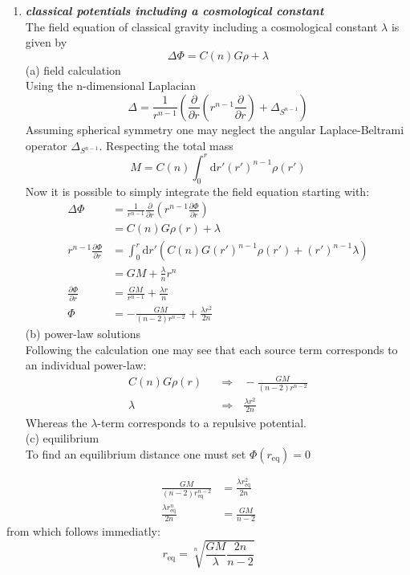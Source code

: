 \documentclass[a4paper,12pt]{article}
\newcommand{\question}[1]{\textbf{\textit{#1}}}
\begin{document}
\begin{enumerate}
		\item \question{classical potentials including a cosmological constant}\\
		The field equation of classical gravity including a cosmological constant $\lambda$ is given by
		\begin{equation}
		\Delta\Phi = C(n) G\rho + \lambda
		\end{equation}
		(a) field calculation\\
		Using the n-dimensional Laplacian \[\Delta=\frac{1}{r^{n-1}}\left(\frac{\partial}{\partial r}\left(r^{n-1}\frac{\partial}{\partial r}\right)+\Delta_{S^{n-1}}\right)\]
		Assuming spherical symmetry one may neglect the angular Laplace-Beltrami operator \(\Delta_{S^{n-1}}\).
		Respecting the total mass \[M=C(n)\int_0^r\textrm{d}r'\left(r'\right)^{n-1}\rho(r')\]
		Now it is possible to simply integrate the field equation starting with:
		\begin{align}
		  \Delta\Phi&=\frac{1}{r^{n-1}}\frac{\partial}{\partial r}\left(r^{n-1}\frac{\partial\Phi}{\partial r}\right)\\
		  &=C(n)G\rho(r)+\lambda\\
		  r^{n-1}\frac{\partial\Phi}{\partial r}&=\int_0^r\textrm{d}r'\left(C(n)G\left(r'\right)^{n-1}\rho\left(r'\right)+\left(r'\right)^{n-1}\lambda\right)\\
		  &=GM+\frac{\lambda}{n}r^n\\
		  \frac{\partial\Phi}{\partial r}&=\frac{GM}{r^{n-1}}+\frac{\lambda r}{n}\\
		  \Phi&=-\frac{GM}{\left(n-2\right)r^{n-2}}+\frac{\lambda r^2}{2n}
		\end{align}
		(b) power-law solutions\\
		Following the calculation one may see that each source term corresponds to an individual power-law:
		\begin{align*}
		  C(n)G\rho(r) ~~~ &\Rightarrow ~~~ -\frac{GM}{\left(n-2\right)r^{n-2}}\\
		  \lambda ~~~ &\Rightarrow ~~~ \frac{\lambda r^2}{2n}
		\end{align*}
		Whereas the \(\lambda\)-term corresponds to a repulsive potential.\\
		(c) equilibrium\\
		To find an equilibrium distance one must set \(\Phi\left(r_\textrm{eq}\right)=0\)
		\end{enumerate}
		\begin{align}
		  \frac{GM}{\left(n-2\right)r_\textrm{eq}^{n-2}}&=\frac{\lambda r_\textrm{eq}^2}{2n}\\
		  \frac{\lambda r_\textrm{eq}^n}{2n}&=\frac{GM}{n-2}
		\end{align}
		from which follows immediatly:
		\begin{equation}
		  r_\textrm{eq}=\sqrt[n]{\frac{GM}{\lambda}\frac{2n}{n-2}}
		\end{equation}
		
\end{document}
